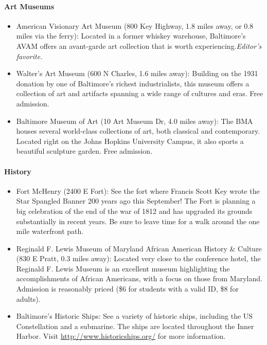 \paragraph*{Art Museums}
\begin{itemize}
\item{American Visionary Art Museum (800 Key Highway, 1.8 miles away, or 0.8 miles via the ferry): Located in a former whiskey warehouse, Baltimore's AVAM offers an avant-garde art collection that is worth experiencing.\it{Editor's favorite}.}
\item{Walter's Art Museum (600 N Charles, 1.6 miles away): Building on the 1931 donation by one of
  Baltimore's richest industrialists, this museum offers a collection of art and artifacts spanning
  a wide range of cultures and eras. Free admission.}
\item{Baltimore Museum of Art (10 Art Museum Dr, 4.0 miles away): The BMA houses several world-class
  collections of art, both classical and contemporary. Located right on the Johns Hopkins University
  Campus, it also sports a beautiful sculpture garden. Free admission.}
\end{itemize}

\paragraph*{History}
\begin{itemize}
\item{Fort McHenry (2400 E Fort): See the fort where Francis Scott Key wrote the Star Spangled Banner 200 years ago this September! The Fort is planning a big celebration of the end of the war of 1812 and has upgraded its grounds substantially in recent years. Be sure to leave time for a walk around the one mile waterfront path.}
\item{Reginald F. Lewis Museum of Maryland African American History \& Culture (830 E Pratt, 0.3 miles away): Located very close to the conference hotel, the Reginald F. Lewis Museum is an excellent museum highlighting the accomplishments of African Americans, with a focus on those from Maryland. Admission is reasonably priced (\$6 for students with a valid ID, \$8 for adults).}
\item{Baltimore's Historic Ships: See a variety of historic ships, including the US Constellation and a submarine. The ships are located throughout the Inner Harbor. Visit \url{http://www.historicships.org/} for more information.}
\end{itemize}

